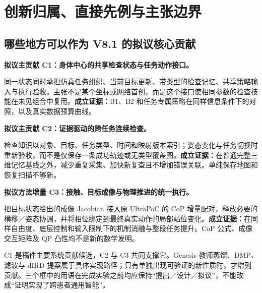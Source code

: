 \documentclass[UTF8,11pt,a4paper,fontset=fandol]{ctexart}
\numberwithin{equation}{section}
\theoremstyle{definition}
\begin{document}
\clearpage
\appendix
\section{创新归属、直接先例与主张边界}
\label{app:novelty}
\subsection{哪些地方可以作为 V8.1 的拟议核心贡献}
\begin{keybox}
\textbf{拟议主贡献 C1：身体中心的共享检查状态与任务动作接口。}\par
同一状态同时承担仿真任务组织、当前目标更新、带类型的检查记忆、共享策略输入与执行验收。主张不是某个坐标或网络首创，而是这个接口使相同参数的检查技能在未见组合中复用。\textbf{成立证据：}B1、B2 和任务专属策略在同样信息条件下的对照，以及真实数据预算曲线。
\end{keybox}
\begin{keybox}
\textbf{拟议主贡献 C2：证据驱动的跨任务连续检查。}\par
检查知识以对象、目标、任务类型、时间和映射版本索引；姿态变化与任务切换时重新验收，而不是仅保存一条成功轨迹或无类型覆盖图。\textbf{成立证据：}在普通完整三维记忆基线之外，减少重复采集、加快新复查且不增加错误关联。单纯保存地图和恢复扫描不够新。
\end{keybox}
\begin{keybox}
\textbf{拟议方法增量 C3：接触、目标成像与物理推进的统一执行。}\par
把目标状态给出的成像 Jacobian 接入原 UltraPoC 的 CoP 增量配对，释放必要的横移／姿态协调，并将相位绑定到最终真实动作的局部站位变化。\textbf{成立证据：}在同样自由度、底层控制和输入限制下的机制消融与整段任务提升。CoP 公式、成像交互矩阵及 QP 凸性均不是新的数学发明。
\end{keybox}
C1 是稿件主要系统贡献候选，C2 与 C3 共同支撑它。Genesis 教师蒸馏、DMP、滤波与 dIRD 提案属于具体实现路径；只有单独出现可验证的新性质时，才增列贡献。三个框中的用语在完成实验之前均应保持“提出／设计／拟议”，不能改成“证明实现了跨患者通用智能”。
\end{document}
